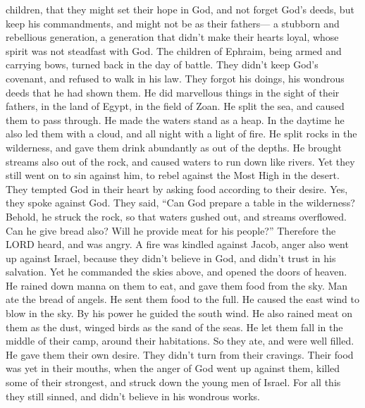 children,  that they might set their hope in God, and not
forget God's deeds, but keep his commandments,  and might
not be as their fathers--- a stubborn and rebellious generation, a
generation that didn't make their hearts loyal, whose spirit was not
steadfast with God.  The children of Ephraim, being armed
and carrying bows, turned back in the day of battle.  They
didn't keep God's covenant, and refused to walk in his law.
 They forgot his doings, his wondrous deeds that he had
shown them.  He did marvellous things in the sight of their
fathers, in the land of Egypt, in the field of Zoan.  He
split the sea, and caused them to pass through. He made the waters stand
as a heap.  In the daytime he also led them with a cloud,
and all night with a light of fire.  He split rocks in the
wilderness, and gave them drink abundantly as out of the depths.
 He brought streams also out of the rock, and caused waters
to run down like rivers.  Yet they still went on to sin
against him, to rebel against the Most High in the desert. 
They tempted God in their heart by asking food according to their
desire.  Yes, they spoke against God. They said, ``Can God
prepare a table in the wilderness?  Behold, he struck the
rock, so that waters gushed out, and streams overflowed. Can he give
bread also? Will he provide meat for his people?'' 
Therefore the LORD heard, and was angry. A fire was kindled against
Jacob, anger also went up against Israel,  because they
didn't believe in God, and didn't trust in his salvation. 
Yet he commanded the skies above, and opened the doors of heaven.
 He rained down manna on them to eat, and gave them food
from the sky.  Man ate the bread of angels. He sent them
food to the full.  He caused the east wind to blow in the
sky. By his power he guided the south wind.  He also rained
meat on them as the dust, winged birds as the sand of the seas.
 He let them fall in the middle of their camp, around their
habitations.  So they ate, and were well filled. He gave
them their own desire.  They didn't turn from their
cravings. Their food was yet in their mouths,  when the
anger of God went up against them, killed some of their strongest, and
struck down the young men of Israel.  For all this they
still sinned, and didn't believe in his wondrous works. 
